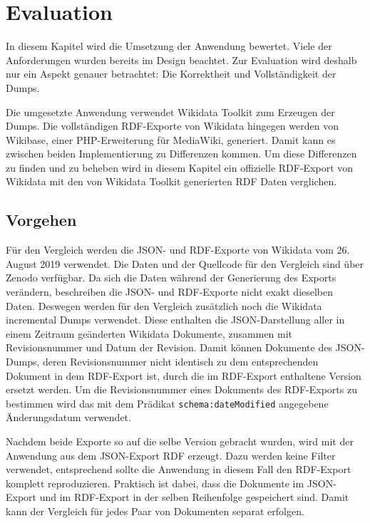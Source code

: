\chapter{Evaluation}
\label{chap:evaluation}
In diesem Kapitel wird die Umsetzung der Anwendung bewertet.
Viele der Anforderungen wurden bereits im Design beachtet.
Zur Evaluation wird deshalb nur ein Aspekt genauer betrachtet: Die Korrektheit und Vollständigkeit der Dumps.

Die umgesetzte Anwendung verwendet Wikidata Toolkit zum Erzeugen der Dumps.
Die vollständigen RDF-Exporte von Wikidata hingegen werden von Wikibase, einer PHP-Erweiterung für MediaWiki, generiert.
Damit kann es zwischen beiden Implementierung zu Differenzen kommen.
Um diese Differenzen zu finden und zu beheben wird in diesem Kapitel ein offizielle RDF-Export von Wikidata mit den von Wikidata Toolkit generierten RDF Daten verglichen. 

\section{Vorgehen}
Für den Vergleich werden die JSON- und RDF-Exporte von Wikidata vom 26. August 2019 verwendet.
Die Daten und der Quellcode für den Vergleich sind über Zenodo verfügbar\cite{zenodo-diff-data}.
Da sich die Daten während der Generierung des Exports verändern, beschreiben die JSON- und RDF-Exporte nicht exakt dieselben Daten.
Deswegen werden für den Vergleich zusätzlich noch die Wikidata incremental Dumps verwendet.
Diese enthalten die JSON-Darstellung aller in einem Zeitraum geänderten Wikidata Dokumente, zusammen mit Revisionsnummer und Datum der Revision. 
Damit können Dokumente des JSON-Dumps, deren Revisionsnummer nicht identisch zu dem entsprechenden Dokument in dem RDF-Export ist, durch die im RDF-Export enthaltene Version ersetzt werden.
Um die Revisionsnummer eines Dokuments des RDF-Exports zu bestimmen wird das mit dem Prädikat \verb|schema:dateModified| angegebene Änderungsdatum verwendet.

Nachdem beide Exporte so auf die selbe Version gebracht wurden, wird mit der Anwendung aus dem JSON-Export RDF erzeugt.
Dazu werden keine Filter verwendet, entsprechend sollte die Anwendung in diesem Fall den RDF-Export komplett reproduzieren.
Praktisch ist dabei, dass die Dokumente im JSON-Export und im RDF-Export in der selben Reihenfolge gespeichert sind.
Damit kann der Vergleich für jedes Paar von Dokumenten separat erfolgen.

